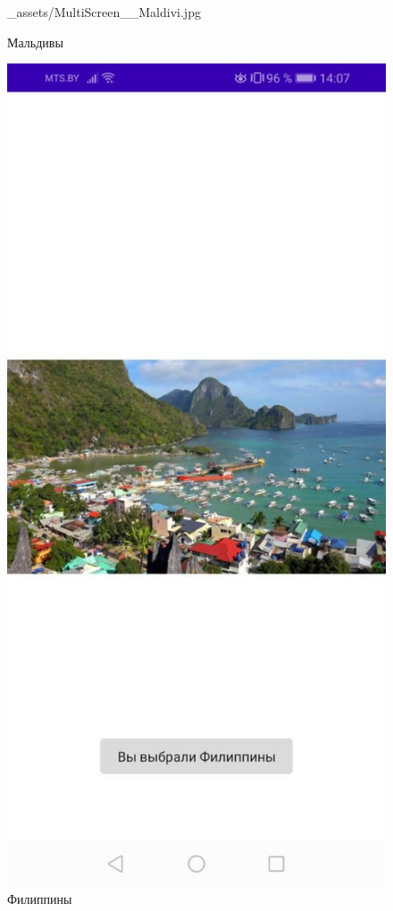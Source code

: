 \documentclass[12pt, a4paper, simple]{eskdtext}
\begin{document}
\begin{figure}[!h]
\begin{minipage}{0.19\textwidth}
                {_assets/MultiScreen__Maldivi.jpg}
            \caption{Мальдивы}
            \label{fig:MultiScreen__Maldivi}
        \end{minipage}
        \begin{minipage}{0.19\textwidth}
            \centering
            \includegraphics[width=\linewidth]
                {_assets/MultiScreen__Philippini.jpg}
            \caption{Филиппины}
            \label{fig:MultiScreen__Philippini}
        \end{minipage}
    \end{figure}
\end{document}
